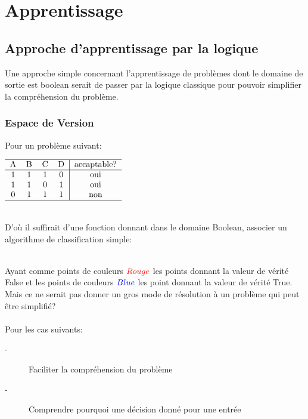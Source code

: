 \part{Apprentissage}
\pagebreak

\chapter{Approche d'apprentissage par la logique}
Une approche simple concernant l'apprentissage de problèmes dont le domaine de sortie est boolean
serait de passer par la logique classique pour pouvoir simplifier la compréhension du problème.\\
\pagebreak
\section{Espace de Version}
Pour un problème suivant:

$\begin{tabular}{cccc|c}
\hline
A & B & C & D & accaptable? \\
\hline
1 & 1 & 1 & 0 & oui\\
1 & 1 & 0 & 1 & oui\\
0 & 1 & 1 & 1 & non\\
\hline
\end{tabular}$

\ \\
D'où il suffirait d'une fonction donnant dans le domaine Boolean, associer un algorithme de classification simple:\\
\ \\
\vspace{1cm}

\vspace{1cm}

Ayant comme points de couleurs $\textcolor{red}{Rouge}$ les points donnant la valeur de vérité False et les points de couleurs $\textcolor{blue}{Blue}$ les point donnant la valeur de vérité True.\\
Mais ce ne serait pas donner un gros mode de résolution à un problème qui peut être simplifié?\\
\\
Pour les cas suivants:
\begin{description}
\item[-] Faciliter la compréhension du problème
\item[-] Comprendre pourquoi une décision donné pour une entrée
\end{description}
\pagebreak

